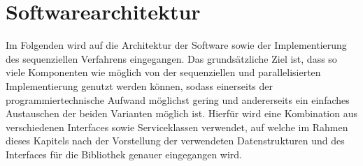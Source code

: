 \section{Softwarearchitektur}
\label{sec:software_architecture}
Im Folgenden wird auf die Architektur der Software sowie der Implementierung des sequenziellen Verfahrens eingegangen. Das grundsätzliche Ziel ist, dass so viele Komponenten wie möglich von der sequenziellen und parallelisierten Implementierung genutzt werden können, sodass einerseits der programmiertechnische Aufwand möglichst gering und andererseits ein einfaches Austauschen der beiden Varianten möglich ist. Hierfür wird eine Kombination aus verschiedenen Interfaces sowie Serviceklassen verwendet, auf welche im Rahmen dieses Kapitels nach der Vorstellung der verwendeten Datenstrukturen und des Interfaces für die Bibliothek genauer eingegangen wird.
 
